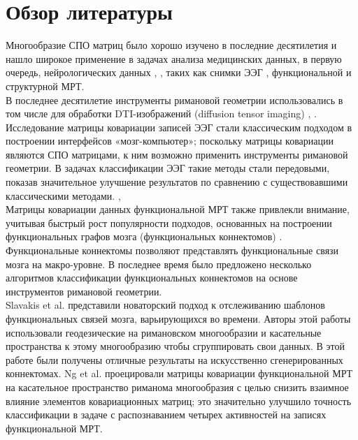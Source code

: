 \chapter{Обзор литературы}

\indent Многообразие СПО матриц было хорошо изучено в последние десятилетия и нашло широкое применение в задачах анализа медицинских данных, в первую очередь, нейрологических данных \cite{pennec2006riemannian}, \cite{fletcher2007riemannian}, таких как снимки ЭЭГ \cite{barachant2013classification}, функциональной и структурной МРТ. \\

\indent В последнее десятилетие инструменты римановой геометрии использовались в том числе для обработки DTI-изображений (diffusion tensor imaging) \cite{fletcher2007riemannian}, \cite{pennec2006riemannian}. Исследование матрицы ковариации записей ЭЭГ стали классическим подходом в построении интерфейсов «мозг-компьютер»; поскольку матрицы ковариации являются СПО матрицами, к ним возможно применить инструменты римановой геометрии. В задачах классификации ЭЭГ такие методы стали передовыми, показав значительное улучшение результатов по сравнению с существовавшими классическими методами. \cite{barachant2012multiclass}, \cite{barachant2013classification}\\

\indent Матрицы ковариации данных функциональной МРТ также привлекли внимание, учитывая быстрый рост популярности подходов, основанных на построении функциональных графов мозга (функциональных коннектомов) \cite{smith2013functional}. Функциональные коннектомы позволяют представлять функциональные связи мозга на макро-уровне. В последнее время было предложено несколько алгоритмов классификации функциональных коннектомов на основе инструментов римановой геометрии. \\
\indent Slavakis et al.\cite{slavakis2016clustering} представили новаторский подход к отслеживанию шаблонов функциональных связей мозга, варьирующихся во времени. Авторы этой работы использовали геодезические на римановском многообразии и касательные пространства к этому многообразию чтобы сгруппировать свои данных. В этой работе были получены отличные результаты на искусственно сгенерированных коннектомах. Ng et al. \cite{ng2016transport} проецировали матрицы ковариации функциональной МРТ на касательное пространство риманома многообразия с целью снизить взаимное влияние элементов ковариационных матриц; это значительно улучшило точность классификации в задаче с распознаванием четырех активностей на записях функциональной МРТ. \\
\newpage

